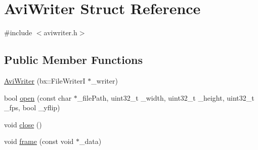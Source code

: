 \hypertarget{struct_avi_writer}{\section{Avi\+Writer Struct Reference}
\label{struct_avi_writer}
}


{\ttfamily \#include $<$aviwriter.\+h$>$}

\subsection*{Public Member Functions}
\begin{DoxyCompactItemize}
\item 
\hyperlink{struct_avi_writer_aa57972191885eae0fe13fad3514e4103}{Avi\+Writer} (bx\+::\+File\+Writer\+I $\ast$\+\_\+writer)
\item 
bool \hyperlink{struct_avi_writer_acdece615c8c67e56fa8e7c9fea3ab57b}{open} (const char $\ast$\+\_\+file\+Path, uint32\+\_\+t \+\_\+width, uint32\+\_\+t \+\_\+height, uint32\+\_\+t \+\_\+fps, bool \+\_\+yflip)
\item 
void \hyperlink{struct_avi_writer_a7bccb6741dbfd3bcbc7b21899c49b6d4}{close} ()
\item 
void \hyperlink{struct_avi_writer_af0359472ec22c0b07d11fb4d89a48ae5}{frame} (const void $\ast$\+\_\+data)
\end{DoxyCompactItemize}
